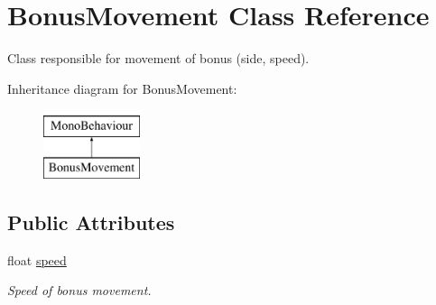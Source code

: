 \hypertarget{class_bonus_movement}{}\section{Bonus\+Movement Class Reference}
\label{class_bonus_movement}


Class responsible for movement of bonus (side, speed).  


Inheritance diagram for Bonus\+Movement\+:\begin{figure}[H]
\begin{center}
\leavevmode
\includegraphics[height=2.000000cm]{class_bonus_movement}
\end{center}
\end{figure}
\subsection*{Public Attributes}
\begin{DoxyCompactItemize}
\item 
float \mbox{\hyperlink{class_bonus_movement_af663a81c63835c143bc17cb1f86e8e46}{speed}}
\begin{DoxyCompactList}\small\item\em Speed of bonus movement. \end{DoxyCompactList}\end{DoxyCompactItemize}
